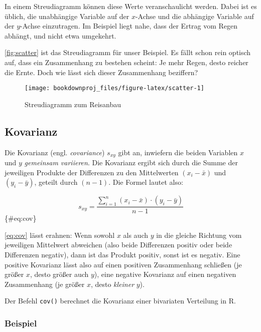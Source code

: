 \documentclass[
  ngerman,
]{article}
\begin{document}
In einem Streudiagramm können diese Werte veranschaulicht werden. Dabei ist es üblich, die unabhängige Variable auf der \(x\)-Achse und die abhängige Variable auf der \(y\)-Achse einzutragen. Im Beispiel liegt nahe, dass der Ertrag vom Regen abhängt, und nicht etwa umgekehrt.

\autoref{fig:scatter} ist das Streudiagramm für unser Beispiel. Es fällt schon rein optisch auf, dass ein Zusammenhang zu bestehen scheint: Je mehr Regen, desto reicher die Ernte. Doch wie lässt sich dieser Zusammenhang beziffern?

\begin{figure}[h]

{\centering \texttt{[image: bookdownproj\_files/figure-latex/scatter-1]} 

}

\caption{Streudiagramm zum Reisanbau}\label{fig:scatter}
\end{figure}

\hypertarget{kovarianz}{%
\subsection{Kovarianz}\label{kovarianz}}

Die Kovarianz (engl. \emph{covariance}) \(s_{xy}\) gibt an, inwiefern die beiden Variablen \(x\) und \(y\) \emph{gemeinsam variieren}. Die Kovarianz ergibt sich durch die Summe der jeweiligen Produkte der Differenzen zu den Mittelwerten \((x_i-\bar{x})\) und \((y_i-\bar{y})\), geteilt durch \((n-1)\). Die Formel lautet also:

\[
s_{xy}=\frac{\sum\limits^n_{i=1}(x_i-\bar{x})\cdot(y_i-\bar{y})}{n-1}
\]\{\#eq:cov\}

\autoref{eq:cov} lässt erahnen: Wenn sowohl \(x\) als auch \(y\) in die gleiche Richtung vom jeweiligen Mittelwert abweichen (also beide Differenzen positiv oder beide Differenzen negativ), dann ist das Produkt positiv, sonst ist es negativ. Eine positive Kovarianz lässt also auf einen positiven Zusammenhang schließen (je größer \(x\), desto größer auch \(y\)), eine negative Kovarianz auf einen negativen Zusammenhang (je größer \(x\), desto \emph{kleiner} \(y\)).

\begin{rtip}
Der Befehl {\tt cov()} berechnet die Kovarianz einer bivariaten Verteilung in R.
\end{rtip}

\hypertarget{beispiel-24}{%
\subsubsection{Beispiel}\label{beispiel-24}}
\end{document}
